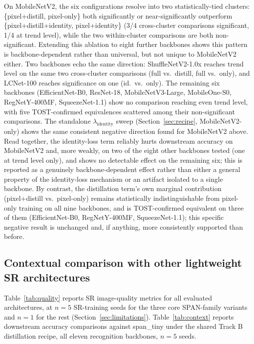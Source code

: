 \documentclass[11pt]{article}
\begin{document}
On MobileNetV2, the six configurations resolve into two statistically-tied clusters: \{pixel+distill, pixel-only\} both significantly or near-significantly outperform \{pixel+distill+identity, pixel+identity\} (3/4 cross-cluster comparisons significant, 1/4 at trend level), while the two within-cluster comparisons are both non-significant. Extending this ablation to eight further backbones shows this pattern is backbone-dependent rather than universal, but not unique to MobileNetV2 either. Two backbones echo the same direction: ShuffleNetV2-1.0x reaches trend level on the same two cross-cluster comparisons (full vs.\ distill, full vs.\ only), and LCNet-100 reaches significance on one (id.\ vs.\ only). The remaining six backbones (EfficientNet-B0, ResNet-18, MobileNetV3-Large, MobileOne-S0, RegNetY-400MF, SqueezeNet-1.1) show no comparison reaching even trend level, with five TOST-confirmed equivalences scattered among their non-significant comparisons. The standalone $\lambda_{\text{identity}}$ sweep (Section~\ref{sec:recipe}, MobileNetV2-only) shows the same consistent negative direction found for MobileNetV2 above. Read together, the identity-loss term reliably hurts downstream accuracy on MobileNetV2 and, more weakly, on two of the eight other backbones tested (one at trend level only), and shows no detectable effect on the remaining six; this is reported as a genuinely backbone-dependent effect rather than either a general property of the identity-loss mechanism or an artifact isolated to a single backbone. By contrast, the distillation term's own marginal contribution (pixel+distill vs.\ pixel-only) remains statistically indistinguishable from pixel-only training on all nine backbones, and is TOST-confirmed equivalent on three of them (EfficientNet-B0, RegNetY-400MF, SqueezeNet-1.1); this specific negative result is unchanged and, if anything, more consistently supported than before.

\subsection{Contextual comparison with other lightweight SR architectures}
\label{sec:res-context}

Table~\ref{tab:quality} reports SR image-quality metrics for all evaluated architectures, at $n=5$ SR-training seeds for the three core SPAN-family variants and $n=1$ for the rest (Section~\ref{sec:limitations}). Table~\ref{tab:context} reports downstream accuracy comparisons against span\_tiny under the shared Track B distillation recipe, all eleven recognition backbones, $n=5$ seeds.
\end{document}
